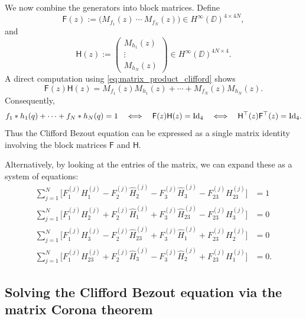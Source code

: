 \documentclass[11pt]{amsart}
\begin{document}
We now combine the generators into block matrices.  Define
\begin{equation}\label{eq:blockF_clifford}
\mathsf{F}(z)
:=
\bigl(
M_{f_1}(z)\ \cdots\ M_{f_N}(z)
\bigr)
\in H^\infty(\DD)^{4\times 4N},
\end{equation}
and
\begin{equation}\label{eq:blockH_clifford}
\mathsf{H}(z)
:=
\begin{pmatrix}
M_{h_1}(z)\\
\vdots\\
M_{h_N}(z)
\end{pmatrix}
\in H^\infty(\DD)^{4N\times 4}.
\end{equation}
A direct computation using \eqref{eq:matrix_product_clifford} shows
\begin{equation}\label{eq:block_identity_clifford}
\mathsf{F}(z) \mathsf{H}(z)
=
M_{f_1}(z)M_{h_1}(z)
+\cdots+
M_{f_N}(z)M_{h_N}(z).
\end{equation}
Consequently,
\begin{equation}\label{eq:clifford_bezout_matrix}
f_1*h_1(q)+\cdots+f_N*h_N(q)=1
\quad\Longleftrightarrow\quad
\mathsf{F}(z) \mathsf{H}(z)=\textnormal{Id}_4 \quad\Longleftrightarrow\quad \mathsf{H}^{\top}(z) \mathsf{F}^{\top}(z)=\textnormal{Id}_4.
\end{equation}
Thus the Clifford Bezout equation can be expressed as a single matrix identity involving the block matrices $\mathsf{F}$ and $\mathsf{H}$.

Alternatively, by looking at the entries of the matrix, we can expand these as a system of equations:
\begin{align}
\sum_{j=1}^{N} \Big[ F_1^{(j)} H_1^{(j)} - F_2^{(j)} \hat H_2^{(j)} - F_3^{(j)} \hat H_3^{(j)} - F_{23}^{(j)} H_{23}^{(j)} \Big] &= 1 \\
\sum_{j=1}^{N} \Big[ F_1^{(j)} H_2^{(j)} + F_2^{(j)} \hat H_1^{(j)} + F_3^{(j)} \hat H_{23}^{(j)} - F_{23}^{(j)} H_3^{(j)} \Big] &= 0 \\
\sum_{j=1}^{N} \Big[ F_1^{(j)} H_3^{(j)} - F_2^{(j)} \hat H_{23}^{(j)} + F_3^{(j)} \hat H_1^{(j)} + F_{23}^{(j)} H_2^{(j)} \Big] &= 0 \\
\sum_{j=1}^{N} \Big[ F_1^{(j)} H_{23}^{(j)} + F_2^{(j)} \hat H_3^{(j)} - F_3^{(j)} \hat H_2^{(j)} + F_{23}^{(j)} H_1^{(j)} \Big] &= 0.
\end{align}


\subsection{Solving the Clifford Bezout equation via the matrix Corona theorem}
\end{document}

